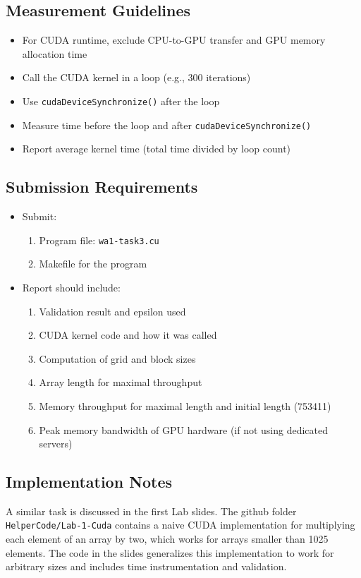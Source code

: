 \documentclass{article}
\begin{document}
\subsection{Measurement Guidelines}

\begin{itemize}
    \item For CUDA runtime, exclude CPU-to-GPU transfer and GPU memory allocation time
    \item Call the CUDA kernel in a loop (e.g., 300 iterations)
    \item Use \texttt{cudaDeviceSynchronize()} after the loop
    \item Measure time before the loop and after \texttt{cudaDeviceSynchronize()}
    \item Report average kernel time (total time divided by loop count)
\end{itemize}

\subsection{Submission Requirements}

\begin{itemize}
    \item Submit:
    \begin{enumerate}
        \item Program file: \texttt{wa1-task3.cu}
        \item Makefile for the program
    \end{enumerate}
    \item Report should include:
    \begin{enumerate}
        \item Validation result and epsilon used
        \item CUDA kernel code and how it was called
        \item Computation of grid and block sizes
        \item Array length for maximal throughput
        \item Memory throughput for maximal length and initial length (753411)
        \item Peak memory bandwidth of GPU hardware (if not using dedicated servers)
    \end{enumerate}
\end{itemize}

\subsection{Implementation Notes}

A similar task is discussed in the first Lab slides. The github folder \texttt{HelperCode/Lab-1-Cuda} contains a naive CUDA implementation for multiplying each element of an array by two, which works for arrays smaller than 1025 elements. The code in the slides generalizes this implementation to work for arbitrary sizes and includes time instrumentation and validation.
\end{document}
